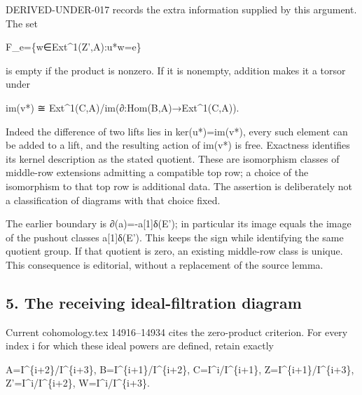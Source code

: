 DERIVED-UNDER-017 records the extra information supplied by this argument. The set

F\_\allowbreak{}e\allowbreak{}=\{w\allowbreak{}∈Ext\textasciicircum{}1(Z',\allowbreak{}A)\allowbreak{}:\allowbreak{}u*w\allowbreak{}=e\}

is empty if the product is nonzero. If it is nonempty,\allowbreak{} addition makes it a torsor under

im(v*)\allowbreak{} ≅ Ext\textasciicircum{}1(C,\allowbreak{}A)\allowbreak{}/\allowbreak{}im(∂:\allowbreak{}Hom(B,\allowbreak{}A)\allowbreak{}\allowbreak{}→Ext\textasciicircum{}1(C,\allowbreak{}A)\allowbreak{})\allowbreak{}.

Indeed the difference of two lifts lies in ker(u*)\allowbreak{}\allowbreak{}=im(v*)\allowbreak{},\allowbreak{} every such element can be added to a lift,\allowbreak{} and the resulting action of im(v*)\allowbreak{} is free. Exactness identifies its kernel description as the stated quotient. These are isomorphism classes of middle-row extensions admitting a compatible top row; a choice of the isomorphism to that top row is additional data. The assertion is deliberately not a classification of diagrams with that choice fixed.

The earlier boundary is ∂(a)\allowbreak{}\allowbreak{}=-a[1]\allowbreak{}δ(E')\allowbreak{}; in particular its image equals the image of the pushout classes a[1]\allowbreak{}δ(E')\allowbreak{}. This keeps the sign while identifying the same quotient group. If that quotient is zero,\allowbreak{} an existing middle-row class is unique. This consequence is editorial,\allowbreak{} without a replacement of the source lemma.

\subsection{5. The receiving ideal-filtration diagram}\label{proofs-8774-9196-the-receiving-ideal-filtration-diagram}

Current cohomology.tex 14916–\allowbreak{}14934 cites the zero-product criterion. For every index i for which these ideal powers are defined,\allowbreak{} retain exactly

A\allowbreak{}=I\textasciicircum{}\{i\allowbreak{}+2\}/\allowbreak{}I\textasciicircum{}\{i\allowbreak{}+3\},\allowbreak{} B\allowbreak{}=I\textasciicircum{}\{i\allowbreak{}+1\}/\allowbreak{}I\textasciicircum{}\{i\allowbreak{}+2\},\allowbreak{} C\allowbreak{}=I\textasciicircum{}i/\allowbreak{}I\textasciicircum{}\{i\allowbreak{}+1\},\allowbreak{} Z\allowbreak{}=I\textasciicircum{}\{i\allowbreak{}+1\}/\allowbreak{}I\textasciicircum{}\{i\allowbreak{}+3\},\allowbreak{} Z'\allowbreak{}=I\textasciicircum{}i/\allowbreak{}I\textasciicircum{}\{i\allowbreak{}+2\},\allowbreak{} W\allowbreak{}=I\textasciicircum{}i/\allowbreak{}I\textasciicircum{}\{i\allowbreak{}+3\}.

